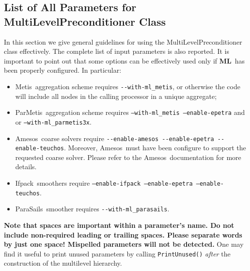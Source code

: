 \documentclass{article}[11pt]
\newcommand{\ML}     {{\bf ML}}
\newcommand{\amesos}  {{\sc Amesos}}
\newcommand{\metis}  {{\sc Metis}}
\newcommand{\parmetis}  {{\sc ParMetis}}
\newcommand{\ifpack}  {{\sc Ifpack}}
\newcommand{\parasails}  {{\sc ParaSails}}
\begin{document}
%
\subsection{List of All Parameters for MultiLevelPreconditioner Class}
\label{all possible parameters}
%
In this section we give general guidelines for using the
MultiLevelPreconditioner class effectively.
The complete list of input parameters is also reported.
%
It is important to point out that some options can be effectively used
only if \ML\ has been properly configured. In particular:
\begin{itemize}
\item \metis\ aggregation scheme requires \verb!--with-ml_metis!, or
  otherwise the code will include all nodes in the calling processor in
  a unique aggregate;
\item \parmetis~aggregation scheme requires {\tt --with-ml\_metis
  --enable-epetra} and  or
  {\tt --with-ml\_parmetis3x}. 
\item \amesos~coarse solvers require \verb!--enable-amesos --enable-epetra --enable-teuchos!. Moreover,
  \amesos~must have been configure to support the requested coarse
  solver. Please refer to the \amesos~documentation for more details.
\item \ifpack~smoothers require {\tt --enable-ifpack --enable-epetra
  --enable-teuchos}.
\item \parasails~smoother requires \verb!--with-ml_parasails!.
\end{itemize}

\medskip

\noindent
{\bf Note that spaces are important within a parameter's name.  Do not
  include non-required leading or trailing spaces. Please separate words by
  just one space! Mispelled parameters will not be detected.} One may
  find it useful to print unused parameters by calling \verb!PrintUnused()!
  {\sl after} the construction of the multilevel hierarchy.\\

\medskip
\end{document}
